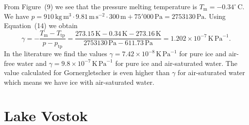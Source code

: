 \documentclass[10pt,DIV12,a4paper,halfparskip]{scrartcl}
\newcommand{\cels}[1]{\ensuremath{#1^{\circ}\,\mathrm{C}}}
\begin{document}
From Figure~(9) we see that the pressure melting temperature is $T_{\text{m}} = -\cels{0.34}$. We have $p = 910\,\text{kg}\,\text{m}^{3} \cdot 9.81\,\text{m}\,\text{s}^{-2}\cdot 300\,\text{m} + 75'000\,\text{Pa} = 2753130\,\text{Pa}$. Using Equation~(14) we obtain
  \begin{equation*}
    \gamma = -\frac{T_{\text{m}}-T_{\text{tp}}}{p - p_{\text{tp}}} = \frac{273.15\,\text{K} -0.34\,\text{K} -273.16\,\text{K}}{2753130\,\text{Pa} - 611.73\,\text{Pa}} = 1.202\times 10^{-7}\,\text{K}\,\text{Pa}^{-1}.
  \end{equation*} In the literature we find the values $\gamma = 7.42 \times 10^{-8} \,\text{K}\,\text{Pa}^{-1}$ for pure ice and air-free water and $\gamma = 9.8 \times 10^{-7} \,\text{K}\,\text{Pa}^{-1}$ for pure ice and air-saturated water. The value calculated for Gornergletscher is even higher than $\gamma$ for air-saturated water which means we have ice with air-saturated water.


\section{Lake Vostok}
\end{document}
